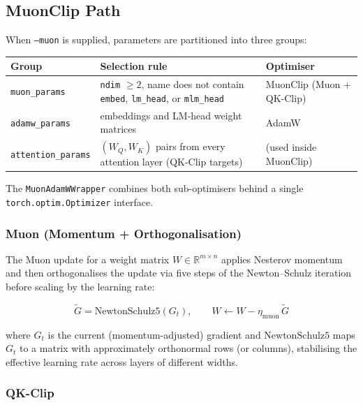 \documentclass[11pt,a4paper]{article}
\begin{document}
\subsection{MuonClip Path}

When \texttt{--muon} is supplied, parameters are partitioned into three groups:

\begin{center}
\begin{tabular}{lll}
\toprule
\textbf{Group} & \textbf{Selection rule} & \textbf{Optimiser} \\
\midrule
\texttt{muon\_params} & \texttt{ndim} $\ge 2$, name does not contain \texttt{embed},
                        \texttt{lm\_head}, or \texttt{mlm\_head} & MuonClip (Muon + QK-Clip) \\
\texttt{adamw\_params} & embeddings and LM-head weight matrices & AdamW \\
\texttt{attention\_params} & $(W_Q, W_K)$ pairs from every attention layer (QK-Clip targets) & (used inside MuonClip) \\
\bottomrule
\end{tabular}
\end{center}

The \texttt{MuonAdamWWrapper} combines both sub-optimisers behind a single
\texttt{torch.optim.Optimizer} interface.

\subsubsection{Muon (Momentum + Orthogonalisation)}

The Muon update for a weight matrix $W \in \mathbb{R}^{m \times n}$ applies Nesterov momentum and
then orthogonalises the update via five steps of the Newton–Schulz iteration before scaling by the
learning rate:

\begin{equation}
  \tilde{G} = \mathrm{NewtonSchulz5}(G_t), \qquad W \leftarrow W - \eta_{\mathrm{muon}}\,\tilde{G}
\end{equation}

where $G_t$ is the current (momentum-adjusted) gradient and $\mathrm{NewtonSchulz5}$ maps $G_t$ to
a matrix with approximately orthonormal rows (or columns), stabilising the effective learning rate
across layers of different widths.

\subsubsection{QK-Clip}
\end{document}
